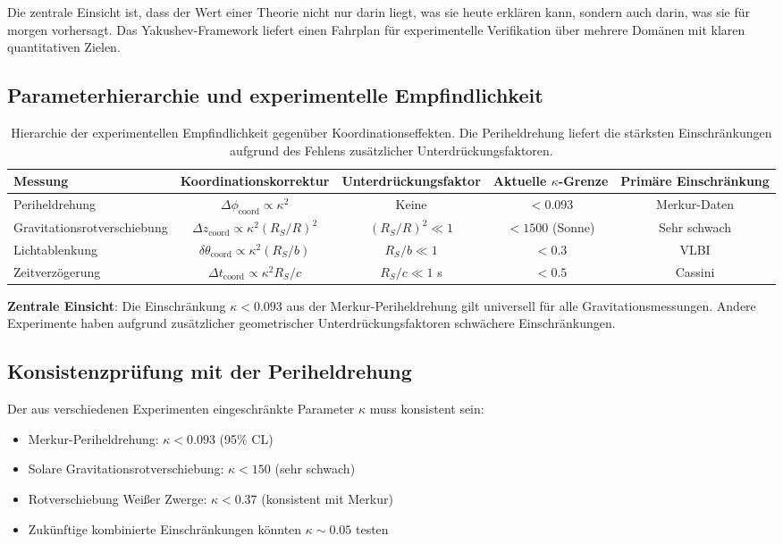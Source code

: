 \documentclass[11pt,a4paper]{article}
\begin{document}
	Die zentrale Einsicht ist, dass der Wert einer Theorie nicht nur darin liegt, was sie heute erklären kann, sondern auch darin, was sie für morgen vorhersagt. Das Yakushev-Framework liefert einen Fahrplan für experimentelle Verifikation über mehrere Domänen mit klaren quantitativen Zielen.
	\subsection{Parameterhierarchie und experimentelle Empfindlichkeit}
	
	\begin{table}[htbp]
		\centering
		\scriptsize
		\begin{tabular}{lcccc}
			\toprule
			\textbf{Messung} & \textbf{Koordinationskorrektur} & \textbf{Unterdrückungsfaktor} & \textbf{Aktuelle $\kappa$-Grenze} & \textbf{Primäre Einschränkung} \\
			\midrule
			Periheldrehung & $\Delta\phi_{\text{coord}} \propto \kappa^2$ & Keine & $<0.093$ & Merkur-Daten \\
			Gravitationsrotverschiebung & $\Delta z_{\text{coord}} \propto \kappa^2(R_S/R)^2$ & $(R_S/R)^2 \ll 1$ & $<1500$ (Sonne) & Sehr schwach \\
			Lichtablenkung & $\delta\theta_{\text{coord}} \propto \kappa^2(R_S/b)$ & $R_S/b \ll 1$ & $<0.3$ & VLBI \\
			Zeitverzögerung & $\Delta t_{\text{coord}} \propto \kappa^2 R_S/c$ & $R_S/c \ll 1$ s & $<0.5$ & Cassini \\
			\bottomrule
		\end{tabular}
		\caption{Hierarchie der experimentellen Empfindlichkeit gegenüber Koordinationseffekten. Die Periheldrehung liefert die stärksten Einschränkungen aufgrund des Fehlens zusätzlicher Unterdrückungsfaktoren.}
		\label{tab:sensitivity-hierarchy}
	\end{table}
	
	\textbf{Zentrale Einsicht}: Die Einschränkung $\kappa < 0.093$ aus der Merkur-Periheldrehung gilt universell für alle Gravitationsmessungen. Andere Experimente haben aufgrund zusätzlicher geometrischer Unterdrückungsfaktoren schwächere Einschränkungen.
	\subsection{Konsistenzprüfung mit der Periheldrehung}
	
	Der aus verschiedenen Experimenten eingeschränkte Parameter $\kappa$ muss konsistent sein:
	\begin{itemize}
		\item Merkur-Periheldrehung: $\kappa < 0.093$ (95\% CL)
		\item Solare Gravitationsrotverschiebung: $\kappa < 150$ (sehr schwach)
		\item Rotverschiebung Weißer Zwerge: $\kappa < 0.37$ (konsistent mit Merkur)
		\item Zukünftige kombinierte Einschränkungen könnten $\kappa \sim 0.05$ testen
	\end{itemize}
	
\end{document}
